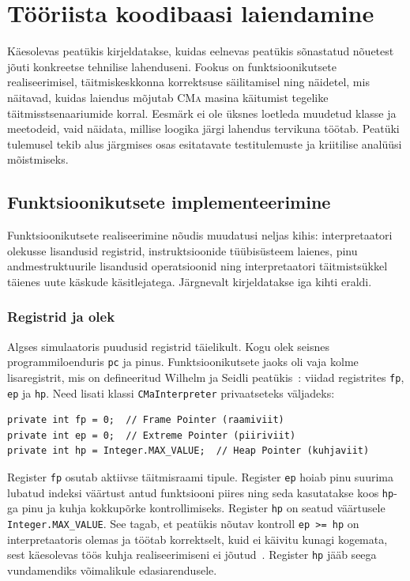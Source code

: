 ﻿\section{Tööriista koodibaasi laiendamine}\label{teostus}

Käesolevas peatükis kirjeldatakse, kuidas eelnevas peatükis sõnastatud nõuetest jõuti konkreetse tehnilise lahenduseni. Fookus on funktsioonikutsete realiseerimisel, täitmiskeskkonna korrektsuse säilitamisel ning näidetel, mis näitavad, kuidas laiendus mõjutab \textsc{CMa} masina käitumist tegelike täitmisstsenaariumide korral. Eesmärk ei ole üksnes loetleda muudetud klasse ja meetodeid, vaid näidata, millise loogika järgi lahendus tervikuna töötab. Peatüki tulemusel tekib alus järgmises osas esitatavate testitulemuste ja kriitilise analüüsi mõistmiseks.

\subsection{Funktsioonikutsete implementeerimine}\label{teostus:funktsioonikutsed}

Funktsioonikutsete realiseerimine nõudis muudatusi neljas kihis: interpretaatori olekusse lisandusid registrid, instruktsioonide tüübisüsteem laienes, pinu andmestruktuurile lisandusid operatsioonid ning interpretaatori täitmistsükkel täienes uute käskude käsitlejatega. Järgnevalt kirjeldatakse iga kihti eraldi.

\subsubsection{Registrid ja olek}

Algses simulaatoris puudusid registrid täielikult. Kogu olek seisnes programmiloenduris \texttt{pc} ja pinus. Funktsioonikutsete jaoks oli vaja kolme lisaregistrit, mis on defineeritud Wilhelm ja Seidli peatükis~\cite{wilhelm_imperative_2010}: viidad registrites \texttt{fp}, \texttt{ep} ja \texttt{hp}. Need lisati klassi \texttt{CMaInterpreter} privaatseteks väljadeks:

\begin{verbatim}
private int fp = 0;  // Frame Pointer (raamiviit)
private int ep = 0;  // Extreme Pointer (piiriviit)
private int hp = Integer.MAX_VALUE;  // Heap Pointer (kuhjaviit)
\end{verbatim}

Register \texttt{fp} osutab aktiivse täitmisraami tipule. Register \texttt{ep} hoiab pinu suurima lubatud indeksi väärtust antud funktsiooni piires ning seda kasutatakse koos \texttt{hp}-ga pinu ja kuhja kokkupõrke kontrollimiseks. Register \texttt{hp} on seatud väärtusele \texttt{Integer.MAX\_VALUE}. See tagab, et peatükis nõutav kontroll \texttt{ep >= hp} on interpretaatoris olemas ja töötab korrektselt, kuid ei käivitu kunagi kogemata, sest käesolevas töös kuhja realiseerimiseni ei jõutud~\cite{wilhelm_imperative_2010}. Register \texttt{hp} jääb seega vundamendiks võimalikule edasiarendusele.

